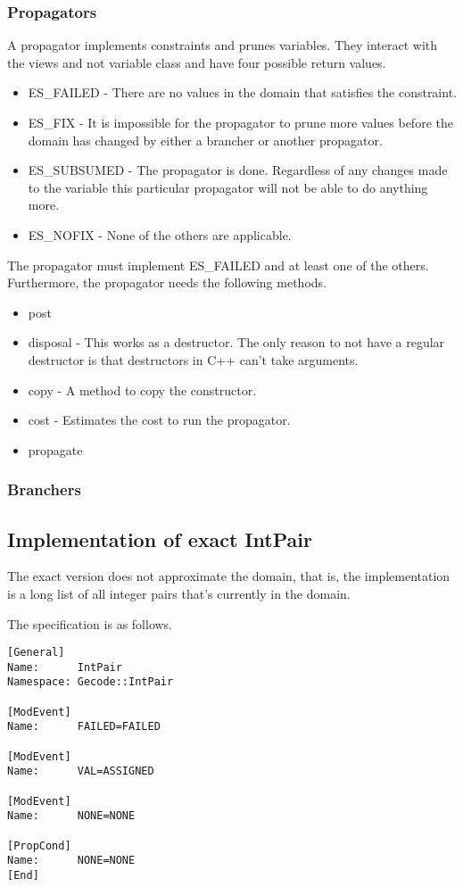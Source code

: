 \documentclass[a4paper,11pt]{article}
\begin{document}
\subsubsection{Propagators}
A propagator implements constraints and prunes variables. They interact with the views and not variable class and have four possible return values.
\begin{itemize}
\item{ES\_FAILED} - There are no values in the domain that satisfies the constraint.
\item{ES\_FIX} - It is impossible for the propagator to prune more values before the domain has changed by either a brancher or another propagator.
\item{ES\_SUBSUMED} - The propagator is done. Regardless of any changes made to the variable this particular propagator will not be able to do anything more.
\item{ES\_NOFIX} - None of the others are applicable.
\end{itemize}
The propagator must implement ES\_FAILED and at least one of the others. Furthermore, the propagator needs the following methods.
\begin{itemize}
\item{post}
\item{disposal} - This works as a destructor. The only reason to not have a regular destructor is that destructors in C++ can't take arguments.
\item{copy} - A method to copy the constructor.
\item{cost} - Estimates the cost to run the propagator.
\item{propagate}
\end{itemize}

\subsubsection{Branchers}

\subsection{Implementation of exact IntPair}
The exact version does not approximate the domain, that is, the implementation is a long list of all integer pairs that's currently in the domain.

The specification is as follows.
\begin{lstlisting}[frame=single]
[General]
Name:      IntPair
Namespace: Gecode::IntPair

[ModEvent]
Name:      FAILED=FAILED

[ModEvent]
Name:      VAL=ASSIGNED

[ModEvent]
Name:      NONE=NONE

[PropCond]
Name:      NONE=NONE
[End]
\end{lstlisting}
\end{document}
